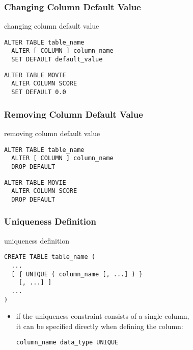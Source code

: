\documentclass[dvipsnames]{beamer}
\theoremstyle{plain}
\begin{document}
\begin{frame}[fragile]
  \frametitle{Changing Column Default Value}

  \begin{block}{changing column default value}
    \begin{lstlisting}
ALTER TABLE table_name
  ALTER [ COLUMN ] column_name
  SET DEFAULT default_value
    \end{lstlisting}
  \end{block}

  \pause
  \medskip
  \begin{example}
    \begin{lstlisting}
ALTER TABLE MOVIE
  ALTER COLUMN SCORE
  SET DEFAULT 0.0
    \end{lstlisting}
  \end{example}
\end{frame}

\begin{frame}[fragile]
  \frametitle{Removing Column Default Value}

  \begin{block}{removing column default value}
    \begin{lstlisting}
ALTER TABLE table_name
  ALTER [ COLUMN ] column_name
  DROP DEFAULT
    \end{lstlisting}
  \end{block}

  \pause
  \medskip
  \begin{example}
    \begin{lstlisting}
ALTER TABLE MOVIE
  ALTER COLUMN SCORE
  DROP DEFAULT
    \end{lstlisting}
  \end{example}
\end{frame}

\begin{frame}[fragile]
  \frametitle{Uniqueness Definition}

  \begin{block}{uniqueness definition}
    \begin{lstlisting}
CREATE TABLE table_name (
  ...
  [ { UNIQUE ( column_name [, ...] ) }
    [, ...] ]
  ...
)
    \end{lstlisting}
  \end{block}

  \pause
  \begin{itemize}
    \item if the uniqueness constraint consists of a single column,\\
      it can be specified directly when defining the column:
      \begin{lstlisting}
column_name data_type UNIQUE
      \end{lstlisting}
  \end{itemize}
\end{frame}
\end{document}

